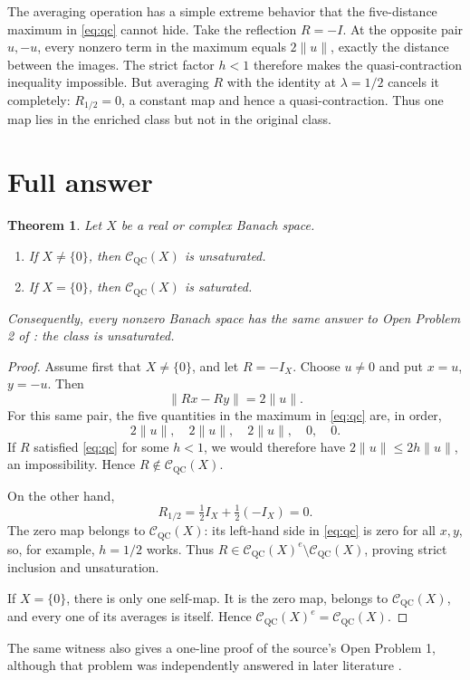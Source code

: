 \documentclass[11pt]{article}
\newtheorem{theorem}{Theorem}
\newcommand{\CQC}{\mathcal C_{\mathrm{QC}}}
\begin{document}
The averaging operation has a simple extreme behavior that the five-distance
maximum in \eqref{eq:qc} cannot hide.  Take the reflection $R=-I$.  At the
opposite pair $u,-u$, every nonzero term in the maximum equals
$2\|u\|$, exactly the distance between the images.  The strict factor $h<1$
therefore makes the quasi-contraction inequality impossible.  But averaging
$R$ with the identity at $\lambda=1/2$ cancels it completely:
$R_{1/2}=0$, a constant map and hence a quasi-contraction.  Thus one map lies
in the enriched class but not in the original class.

\section{Full answer}

\begin{theorem}\label{thm:main}
Let $X$ be a real or complex Banach space.
\begin{enumerate}
\item If $X\ne\{0\}$, then $\CQC(X)$ is unsaturated.
\item If $X=\{0\}$, then $\CQC(X)$ is saturated.
\end{enumerate}
Consequently, every nonzero Banach space has the same answer to Open Problem
2 of \cite{BP21}: the class is unsaturated.
\end{theorem}

\begin{proof}
Assume first that $X\ne\{0\}$, and let $R=-I_X$.  Choose $u\ne0$ and put
$x=u$, $y=-u$.  Then
\[
 \|Rx-Ry\|=2\|u\|.
\]
For this same pair, the five quantities in the maximum in
\eqref{eq:qc} are, in order,
\[
 2\|u\|,\quad 2\|u\|,\quad 2\|u\|,\quad 0,\quad 0.
\]
If $R$ satisfied \eqref{eq:qc} for some $h<1$, we would therefore have
$2\|u\|\le2h\|u\|$, an impossibility.  Hence $R\notin\CQC(X)$.

On the other hand,
\[
 R_{1/2}=\tfrac12 I_X+\tfrac12(-I_X)=0.
\]
The zero map belongs to $\CQC(X)$: its left-hand side in
\eqref{eq:qc} is zero for all $x,y$, so, for example, $h=1/2$ works.  Thus
$R\in\CQC(X)^e\setminus\CQC(X)$, proving strict inclusion and
unsaturation.

If $X=\{0\}$, there is only one self-map.  It is the zero map, belongs to
$\CQC(X)$, and every one of its averages is itself.  Hence
$\CQC(X)^e=\CQC(X)$.
\end{proof}

The same witness also gives a one-line proof of the source's Open Problem 1,
although that problem was independently answered in later literature
\cite{BP22}.
\end{document}
